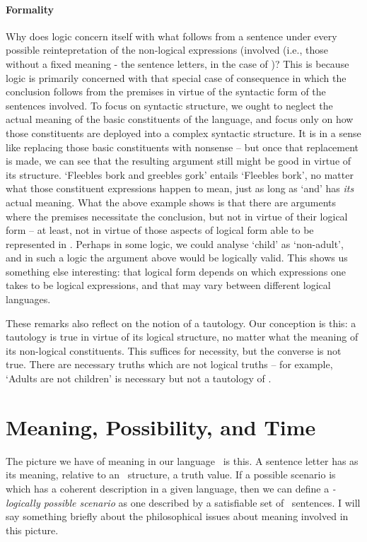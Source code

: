 \paragraph{Formality} Why does logic concern itself with what follows from a sentence under every possible reintepretation of the non-logical expressions (involved (i.e., those without a fixed meaning - the sentence letters, in the case of \lone)? This is because logic is primarily concerned with that special case of consequence in which the conclusion follows from the premises in virtue of the syntactic form of the sentences involved. To focus on syntactic structure, we ought to neglect the actual meaning of the basic constituents of the language, and focus only on how those constituents are deployed into a complex syntactic structure. It is in a sense like replacing those basic constituents with nonsense – but once that replacement is made, we can see that the resulting argument still might be good in virtue of its structure. `Fleebles bork and greebles gork' entails `Fleebles bork', no matter what those constituent expressions happen to mean, just as long as `and' has \emph{its} actual meaning. What the above example shows is that there are arguments where the premises necessitate the conclusion, but not in virtue of their logical form – at least, not in virtue of those aspects of logical form able to be represented in \lone. Perhaps in some logic, we could analyse `child' as `non-adult', and in such a logic the argument above would be logically valid. This shows us something else interesting: that logical form depends on which expressions one takes to be logical expressions, and that may vary between different logical languages.

These remarks also reflect on the notion of a tautology. Our conception is this: a tautology is true in virtue of its logical structure, no matter what the meaning of its non-logical constituents. This suffices for necessity, but the converse is not true. There are necessary truths which are not logical truths – for example, `Adults are not children' is necessary but not a tautology of \lone.

\section{Meaning, Possibility, and Time} The picture we have of meaning in our language \lone\ is this. A sentence letter has as its meaning, relative to an \lone\ structure, a truth value. If a possible scenario is which has a coherent description in a given language, then we can define a \emph{\lone-logically possible scenario} as one described by a satisfiable set of \lone\ sentences. I will say something briefly about the philosophical issues about meaning involved in this picture.

